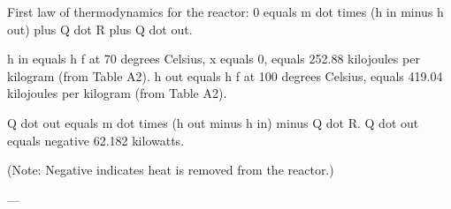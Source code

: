 First law of thermodynamics for the reactor:  
0 equals m dot times (h in minus h out) plus Q dot R plus Q dot out.  

h in equals h f at 70 degrees Celsius, x equals 0, equals 252.88 kilojoules per kilogram (from Table A2).  
h out equals h f at 100 degrees Celsius, equals 419.04 kilojoules per kilogram (from Table A2).  

Q dot out equals m dot times (h out minus h in) minus Q dot R.  
Q dot out equals negative 62.182 kilowatts.  

(Note: Negative indicates heat is removed from the reactor.)  

---